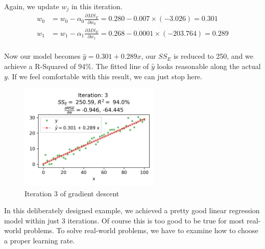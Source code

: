 \documentclass[
	letterpaper
]{article}
\begin{document}
Again, we update $w_j$ in this iteration.
\begin{equation}
\begin{split}
w_0 &= w_0 - \alpha_0 \frac{\partial MS_E}{\partial w_0} = 0.280 - 0.007\times (-3.026) = 0.301\\
w_1 &= w_1 - \alpha_ 1 \frac{\partial MS_E}{\partial w_1} = 0.268 - 0.0001\times (-203.764)=0.289 \\
\end{split}
\end{equation}

Now our model becomes $\hat y = 0.301 + 0.289 x$, our $SS_E$ is reduced to 250, and we achieve a R-Squared of 94\%.
The fitted line of $\hat y$ looks reasonable along the actual $y$.
If we feel comfortable with this result, we can just stop here.
\begin{figure}[htbp]
	\centering
	\includegraphics[width=0.6\textwidth]{figures/visualize-3.png}
	\caption{Iteration 3 of gradient descent}
	\label{fig:vis3}
\end{figure}

In this deliberately designed example, we achieved a pretty good linear regression model within just 3 iterations.
Of course this is too good to be true for most real-world problems.
To solve real-world problems, we have to examine how to choose a proper learning rate.
\end{document}
